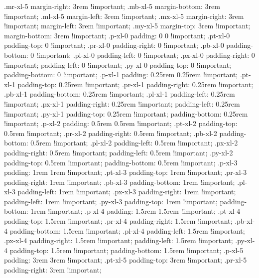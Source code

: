 {{{{{{{{{{{{{{{{{{{{{{{{{{{{{{{{{{{{{{{{{{{{{{{{{{{{{{{{{{{{{{{{{{{{{{{{{{{{{{{{{{{{{{{{{{{{{{{{{{{{{{{{{{{{{{{{{{{{{{{{{{{{{{{{{{{{{{{{{{{{{{{{{{{{{{{{{{{{{{{{{{{{{{{{{{{{{{{{{{{{{{{{{{{{{{{{{{{{{{{{{{{{{{{{{{{{{{{{{{{{{{{{{{{{{{{{{{{{{{{{{{{{{{{{{{{{{{{{{{{{{{{{{{{{{{{{{{{{{{{{{{{{{{{{{{{{{{{{{{{{{{{{{{{  .mr-xl-5 {
    margin-right: 3rem !important; }
  .mb-xl-5 {
    margin-bottom: 3rem !important; }
  .ml-xl-5 {
    margin-left: 3rem !important; }
  .mx-xl-5 {
    margin-right: 3rem !important;
    margin-left: 3rem !important; }
  .my-xl-5 {
    margin-top: 3rem !important;
    margin-bottom: 3rem !important; }
  .p-xl-0 {
    padding: 0 0 !important; }
  .pt-xl-0 {
    padding-top: 0 !important; }
  .pr-xl-0 {
    padding-right: 0 !important; }
  .pb-xl-0 {
    padding-bottom: 0 !important; }
  .pl-xl-0 {
    padding-left: 0 !important; }
  .px-xl-0 {
    padding-right: 0 !important;
    padding-left: 0 !important; }
  .py-xl-0 {
    padding-top: 0 !important;
    padding-bottom: 0 !important; }
  .p-xl-1 {
    padding: 0.25rem 0.25rem !important; }
  .pt-xl-1 {
    padding-top: 0.25rem !important; }
  .pr-xl-1 {
    padding-right: 0.25rem !important; }
  .pb-xl-1 {
    padding-bottom: 0.25rem !important; }
  .pl-xl-1 {
    padding-left: 0.25rem !important; }
  .px-xl-1 {
    padding-right: 0.25rem !important;
    padding-left: 0.25rem !important; }
  .py-xl-1 {
    padding-top: 0.25rem !important;
    padding-bottom: 0.25rem !important; }
  .p-xl-2 {
    padding: 0.5rem 0.5rem !important; }
  .pt-xl-2 {
    padding-top: 0.5rem !important; }
  .pr-xl-2 {
    padding-right: 0.5rem !important; }
  .pb-xl-2 {
    padding-bottom: 0.5rem !important; }
  .pl-xl-2 {
    padding-left: 0.5rem !important; }
  .px-xl-2 {
    padding-right: 0.5rem !important;
    padding-left: 0.5rem !important; }
  .py-xl-2 {
    padding-top: 0.5rem !important;
    padding-bottom: 0.5rem !important; }
  .p-xl-3 {
    padding: 1rem 1rem !important; }
  .pt-xl-3 {
    padding-top: 1rem !important; }
  .pr-xl-3 {
    padding-right: 1rem !important; }
  .pb-xl-3 {
    padding-bottom: 1rem !important; }
  .pl-xl-3 {
    padding-left: 1rem !important; }
  .px-xl-3 {
    padding-right: 1rem !important;
    padding-left: 1rem !important; }
  .py-xl-3 {
    padding-top: 1rem !important;
    padding-bottom: 1rem !important; }
  .p-xl-4 {
    padding: 1.5rem 1.5rem !important; }
  .pt-xl-4 {
    padding-top: 1.5rem !important; }
  .pr-xl-4 {
    padding-right: 1.5rem !important; }
  .pb-xl-4 {
    padding-bottom: 1.5rem !important; }
  .pl-xl-4 {
    padding-left: 1.5rem !important; }
  .px-xl-4 {
    padding-right: 1.5rem !important;
    padding-left: 1.5rem !important; }
  .py-xl-4 {
    padding-top: 1.5rem !important;
    padding-bottom: 1.5rem !important; }
  .p-xl-5 {
    padding: 3rem 3rem !important; }
  .pt-xl-5 {
    padding-top: 3rem !important; }
  .pr-xl-5 {
    padding-right: 3rem !important; }
}}}}}}}}}}}}}}}}}}}}}}}}}}}}}}}}}}}}}}}}}}}}}}}}}}}}}}}}}}}}}}}}}}}}}}}}}}}}}}}}}}}}}}}}}}}}}}}}}}}}}}}}}}}}}}}}}}}}}}}}}}}}}}}}}}}}}}}}}}}}}}}}}}}}}}}}}}}}}}}}}}}}}}}}}}}}}}}}}}}}}}}}}}}}}}}}}}}}}}}}}}}}}}}}}}}}}}}}}}}}}}}}}}}}}}}}}}}}}}}}}}}}}}}}}}}}}}}}}}}}}}}}}}}}}}}}}}}}}}}}}}}}}}}}}}}}}}}}}}}}}}}}}}}
